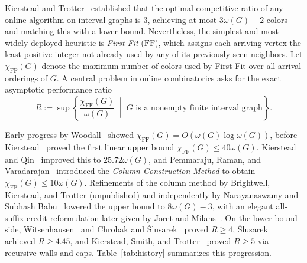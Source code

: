\documentclass[11pt,a4paper]{article}
\theoremstyle{remark}
\newcommand{\chiFF}{\chi_{\mathrm{FF}}}
\begin{document}
Kierstead and Trotter~\cite{kt81} established that the optimal competitive ratio of any online algorithm on interval graphs is $3$, achieving at most $3\omega(G) - 2$ colors and matching this with a lower bound. Nevertheless, the simplest and most widely deployed heuristic is \emph{First-Fit} ($\mathrm{FF}$), which assigns each arriving vertex the least positive integer not already used by any of its previously seen neighbors. Let $\chiFF(G)$ denote the maximum number of colors used by First-Fit over all arrival orderings of $G$. A central problem in online combinatorics asks for the exact asymptotic performance ratio
\[
  R := \sup \left\{ \frac{\chiFF(G)}{\omega(G)} \;\middle|\; G \text{ is a nonempty finite interval graph} \right\}.
\]

Early progress by Woodall~\cite{woodall76} showed $\chiFF(G) = O(\omega(G)\log \omega(G))$, before Kierstead~\cite{kierstead88} proved the first linear upper bound $\chiFF(G) \le 40\omega(G)$. Kierstead and Qin~\cite{kq95} improved this to $25.72\omega(G)$, and Pemmaraju, Raman, and Varadarajan~\cite{prv04} introduced the \emph{Column Construction Method} to obtain $\chiFF(G) \le 10\omega(G)$. Refinements of the column method by Brightwell, Kierstead, and Trotter (unpublished) and independently by Narayanaswamy and Subhash Babu~\cite{nsb08} lowered the upper bound to $8\omega(G) - 3$, with an elegant all-suffix credit reformulation later given by Joret and Milans~\cite{jm11}. On the lower-bound side, Witsenhausen~\cite{witsenhausen76} and Chrobak and \'{S}lusarek~\cite{cs88} proved $R \ge 4$, \'{S}lusarek~\cite{slusarek93} achieved $R \ge 4.45$, and Kierstead, Smith, and Trotter~\cite{kst16} proved $R \ge 5$ via recursive walls and caps. Table~\ref{tab:history} summarizes this progression.
\end{document}
